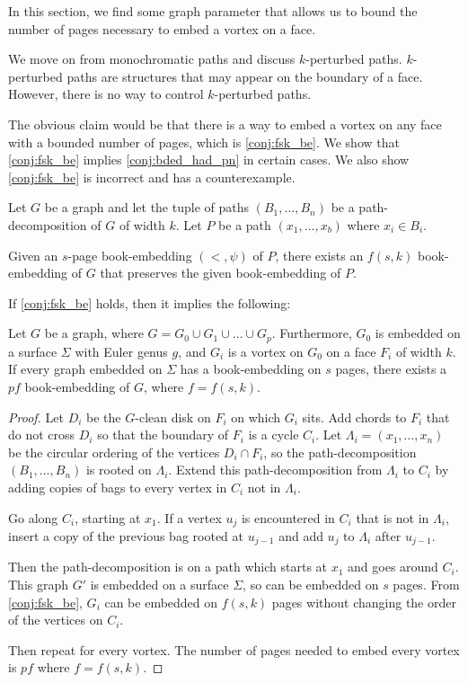 
In this section, we find some graph parameter that allows us to bound the number of pages necessary to embed a vortex on a face.

We move on from monochromatic paths and discuss $k$-perturbed paths. $k$-perturbed paths are structures that may appear on the boundary of a face. However, there is no way to control $k$-perturbed paths. 

The obvious claim would be that there is a way to embed a vortex on any face with a bounded number of pages, which is \cref{conj:fsk_be}. We show that \cref{conj:fsk_be} implies \cref{conj:bded_had_pn} in certain cases. We also show \cref{conj:fsk_be} is incorrect and has a counterexample.
\begin{claim}\label{conj:fsk_be}
	Let $G$ be a graph and let the tuple of paths $(B_1, \ldots, B_n)$ be a path-decomposition of $G$ of width $k$. Let $P$ be a path $(x_1, \ldots, x_b)$ where $x_i \in B_i$. 

	Given an $s$-page book-embedding $(<, \psi)$ of $P$, there exists an $f(s, k)$ book-embedding of $G$ that preserves the given book-embedding of $P$.
\end{claim}

If \cref{conj:fsk_be} holds, then it implies the following:

\begin{corollary}\label{corr:fsk_be}
	Let $G$ be a graph, where $G = G_0 \cup G_1 \cup \ldots \cup G_p$. Furthermore, $G_0$ is embedded on a surface $\Sigma$ with Euler genus $g$, and $G_i$ is a vortex on $G_0$ on a face $F_i$ of width $k$. If every graph embedded on $\Sigma$ has a book-embedding on $s$ pages, there exists a $p f$ book-embedding of $G$, where $f = f(s, k)$.
\end{corollary}

\begin{proof}
	Let $D_i$ be the $G$-clean disk on $F_i$ on which $G_i$ sits. Add chords to $F_i$ that do not cross $D_i$ so that the boundary of $F_i$ is a cycle $C_i$. Let $\Lambda_i= (x_1, \ldots, x_n)$ be the circular ordering of the vertices $D_i \cap F_i$, so the path-decomposition $(B_1, \ldots , B_n)$ is rooted on $\Lambda_i$. Extend this path-decomposition from $\Lambda_i$ to $C_i$ by adding copies of bags to every vertex in $C_i$ not in $\Lambda_i$.

	Go along $C_i$, starting at $x_1$. If a vertex $u_j$ is encountered in $C_i$ that is not in $\Lambda_i$, insert a copy of the previous bag rooted at $u_{j-1}$ and add $u_j$ to $\Lambda_i$ after $u_{j-1}$.
	
	Then the path-decomposition is on a path which starts at $x_1$ and goes around $C_i$.  
	This graph $G'$ is embedded on a surface $\Sigma$, so can be embedded on $s$ pages. From \cref{conj:fsk_be}, $G_i$ can be embedded on $f(s, k)$ pages without changing the order of the vertices on $C_i$.

	Then repeat for every vortex. The number of pages needed to embed every vortex is $p f$ where $f = f(s, k)$. 
\end{proof}

